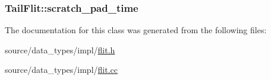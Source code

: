 \hypertarget{classTailFlit_a347d251f3904ba5f7717cae21b3520b}{
\subsubsection[{scratch\_\-pad\_\-time}]{ {\bf TailFlit::scratch\_\-pad\_\-time}}}
\label{classTailFlit_a347d251f3904ba5f7717cae21b3520b}




The documentation for this class was generated from the following files:\begin{CompactItemize}
\item 
source/data\_\-types/impl/\hyperlink{flit_8h}{flit.h}\item 
source/data\_\-types/impl/\hyperlink{flit_8cc}{flit.cc}\end{CompactItemize}
